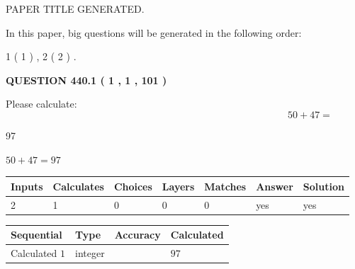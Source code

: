 \documentclass[12pt]{article}
\begin{document}
   
 PAPER TITLE GENERATED.
   
   
   
\vspace{0.2in}
   
In this paper, big questions will be generated in the following order: 
   
   
   1 ( 1 )
 ,
   2 ( 2 )
 .
  
\vspace{0.2in}
  
{\textbf{\Large{QUESTION
440.1 
 ( 1 , 1 , 101 )
}}}
  
  
 
Please calculate:
\begin{equation}
50 +  %
47 = \nonumber
\end{equation}
 
 
 
\noindent{}
 
 

97
 
 
\noindent{}
 
 

 
 
 
\noindent{}
 
 

$ %
50 +  %
47=   %
97$
 
 
\noindent{}
 
 

 
   
   
   
   
\noindent\begin{tabular}{|l|l|l|l|l|l|l|}
 \hline
Inputs & Calculates & Choices & Layers & Matches & Answer & Solution \\ \hline
 2  & 
 1  & 
 0
  & 
 0  & 
 0  & 
  yes & 
  yes 
  \\ \hline
 \end{tabular}
   
   
   
   
\noindent{}
   
   
  
  
\noindent\begin{tabular}{|l|l|l|l|}
\hline
 Sequential & Type & Accuracy & Calculated \\ 
\hline
 
 
  Calculated $  1 $ & integer &  & 
  $ 97 $ 
 \\  \hline  
 \end{tabular}
   
\end{document}
